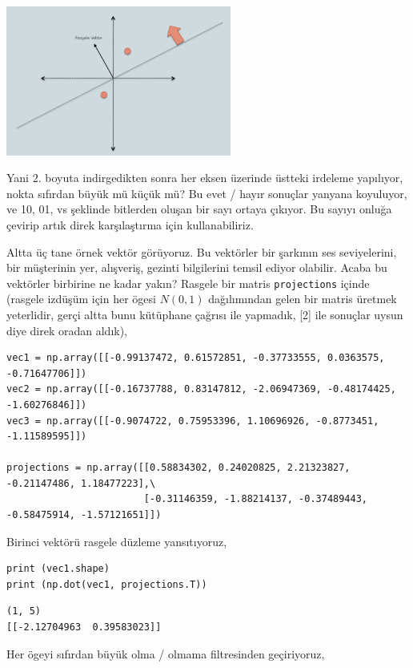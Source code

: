 \documentclass[12pt,fleqn]{article}\usepackage{../../common}
\begin{document}
\includegraphics[width=20em]{algs_073_hash_02.png}

Yani 2. boyuta indirgedikten sonra her eksen üzerinde üstteki irdeleme
yapılıyor, nokta sıfırdan büyük mü küçük mü? Bu evet / hayır sonuçlar yanyana
koyuluyor, ve 10, 01, vs şeklinde bitlerden oluşan bir sayı ortaya çıkıyor. Bu
sayıyı onluğa çevirip artık direk karşılaştırma için kullanabiliriz.

Altta üç tane örnek vektör görüyoruz. Bu vektörler bir şarkının ses
seviyelerini, bir müşterinin yer, alışveriş, gezinti bilgilerini temsil ediyor
olabilir. Acaba bu vektörler birbirine ne kadar yakın? Rasgele bir matris
\verb!projections! içinde (rasgele izdüşüm için her ögesi $N(0,1)$ dağılımından
gelen bir matris üretmek yeterlidir, gerçi altta bunu kütüphane çağrısı ile
yapmadık, [2] ile sonuçlar uysun diye direk oradan aldık),

\begin{verbatim}
vec1 = np.array([[-0.99137472, 0.61572851, -0.37733555, 0.0363575, -0.71647706]])
vec2 = np.array([[-0.16737788, 0.83147812, -2.06947369, -0.48174425, -1.60276846]])
vec3 = np.array([[-0.9074722, 0.75953396, 1.10696926, -0.8773451, -1.11589595]])

projections = np.array([[0.58834302, 0.24020825, 2.21323827, -0.21147486, 1.18477223],\
                        [-0.31146359, -1.88214137, -0.37489443, -0.58475914, -1.57121651]])
\end{verbatim}

Birinci vektörü rasgele düzleme yansıtıyoruz,

\begin{verbatim}
print (vec1.shape)
print (np.dot(vec1, projections.T))
\end{verbatim}

\begin{verbatim}
(1, 5)
[[-2.12704963  0.39583023]]
\end{verbatim}

Her ögeyi sıfırdan büyük olma / olmama filtresinden geçiriyoruz,
\end{document}
